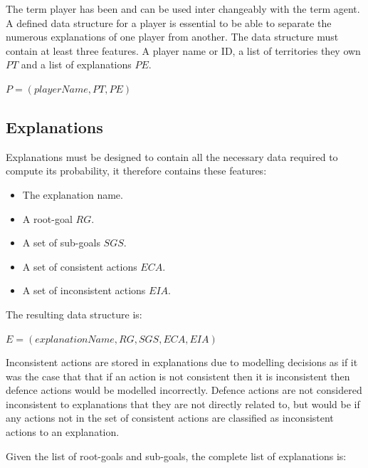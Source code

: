 \documentclass[parskip]{cs4rep}
\begin{document}
The term player has been and can be used inter changeably with the term agent. A defined data structure for a player is essential to be able to separate the numerous explanations of one player from another. The data structure must contain at least three features. A player name or ID, a list of territories they own $PT$ and a list of explanations $PE$.\newline

\centerline{
$P = ( playerName, PT, PE )$
}

\subsection{Explanations}

Explanations must be designed to contain all the necessary data required to compute its probability, it therefore contains these features:

\begin{itemize}
\item
The explanation name.
\item
A root-goal $RG$.
\item
A set of sub-goals $SGS$.
\item
A set of consistent actions $ECA$.
\item
A set of inconsistent actions $EIA$.
\end{itemize}

The resulting data structure is:\newline

\centerline{
$E = ( explanationName, RG, SGS, ECA, EIA )$
}

Inconsistent actions are stored in explanations due to modelling decisions as if it was the case that that if an action is not consistent then it is inconsistent then defence actions would be modelled incorrectly. Defence actions are not considered inconsistent to explanations that they are not directly related to, but would be if any actions not in the set of consistent actions are classified as inconsistent actions to an explanation.

Given the list of root-goals and sub-goals, the complete list of explanations is:
\end{document}
